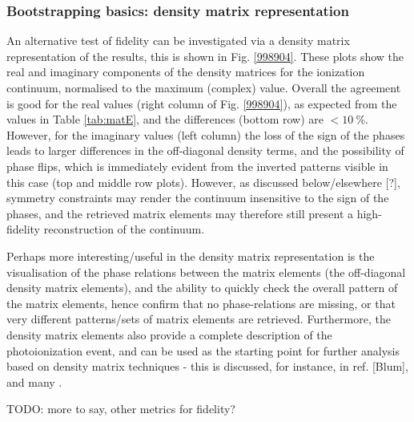 \subsubsection{Bootstrapping basics: density matrix representation}

An alternative test of fidelity can be investigated via a density matrix representation of the results, this is shown in Fig. \ref{998904}. These plots show the real and imaginary components of the density matrices for the ionization continuum, normalised to the maximum (complex) value. Overall the agreement is good for the real values (right column of Fig. \ref{998904}), as expected from the values in Table \ref{tab:matE}, and the differences (bottom row) are $<10~\%$. However, for the imaginary values (left column) the loss of the sign of the phases leads to larger differences in the off-diagonal density terms, and the possibility of phase flips, which is immediately evident from the inverted patterns visible in this case (top and middle row plots). However, as discussed below/elsewhere [?], symmetry constraints may render the continuum insensitive to the sign of the phases, and the retrieved matrix elements may therefore still present a high-fidelity reconstruction of the continuum.

Perhaps more interesting/useful in the density matrix representation is the visualisation of the phase relations between the matrix elements (the off-diagonal density matrix elements), and the ability to quickly check the overall pattern of the matrix elements, hence confirm that no phase-relations are missing, or that very different patterns/sets of matrix elements are retrieved. Furthermore, the density matrix elements also provide a complete description of the photoionization event, and can be used as the starting point for further analysis based on density matrix techniques - this is discussed, for instance, in ref. [Blum], and many .

TODO: more to say, other metrics for fidelity?

